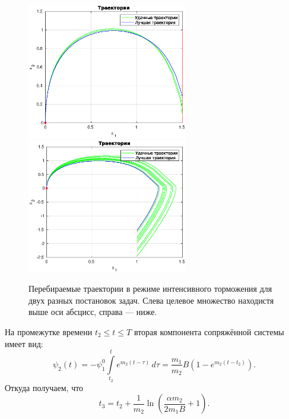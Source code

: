 \begin{figure}[h]
        \hfill
        \includegraphics[width=70mm]{second/int2.eps}
        \hfill
        \hfill
        \includegraphics[width=70mm]{second/int1.eps}
        \hfill
        \caption{Перебираемые траектории в режиме интенсивного торможения для двух разных постановок задач. Слева целевое множество находистя выше оси абсцисс, справа --- ниже.}
\end{figure}

На промежутке времени $t_2 \leqslant t \leqslant T$ вторая компонента сопряжённой системы имеет вид:
$$
        \psi_2(t)
        =
        -\psi_1^0 \int\limits_{t_2}^{t} e^{m_2(t - \tau)}\,d\tau
        =
        \frac{m_1}{m_2}B\left( 1 - e^{m_2(t - t_2)} \right).
$$
Откуда получаем, что
$$
        t_3 = t_2 + \frac 1 {m_2} \ln \left(
                \frac{\alpha m_2}{2m_1B} + 1
        \right).
$$

